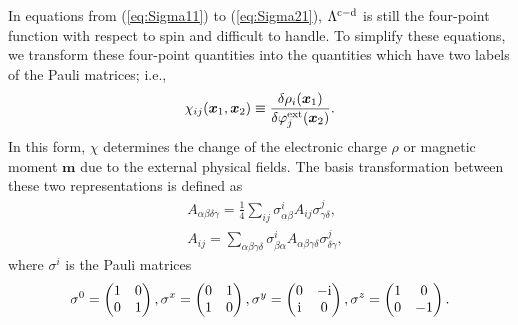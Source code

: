 %
In equations from (\ref{eq:Sigma11}) to (\ref{eq:Sigma21}), $\Lambda^{\rm c - \rm d}$ is still the
four-point function with respect to spin and difficult to handle.
To simplify these equations, we transform these four-point quantities into the quantities which have
two labels of the Pauli matrices; i.e.,
%
\begin{equation}
	\chi_{ij}(\bm x_1, \bm x_2) \equiv 
	\frac{\delta\rho_i(\bm x_1)}{\delta\varphi^{\rm ext}_{j}(\bm x_2)}.
	\label{eq:Paulichi}
\end{equation}
%
In this form, $\chi$ determines the change of the electronic charge $\rho$ or magnetic moment $\bm m$
due to the external physical fields.
The basis transformation between these two representations is defined as 
%
\begin{equation}
	\begin{split}
	& A_{\alpha\beta\delta\gamma} = \frac{1}{4}\sum_{ij}
	\sigma^{i}_{\alpha\beta}A_{ij}\sigma^{j}_{\gamma\delta}, \\
	& A_{ij} = \sum_{\alpha\beta\gamma\delta}
	\sigma^{i}_{\beta\alpha}A_{\alpha\beta\gamma\delta}\sigma^{j}_{\delta\gamma},
	\label{eq:basistrans}
\end{split}
\end{equation}
%
where $\sigma^{i}$ is the Pauli matrices
%
\begin{equation}
	\sigma^0 = 
	\begin{pmatrix}
		1 & 0 \\
		0 & 1
	\end{pmatrix},
	\sigma^x = 
	\begin{pmatrix}
		0 & 1 \\
		1 & 0
	\end{pmatrix},
	\sigma^y = 
	\begin{pmatrix}
		0 & -\rm i \\
		\rm i & 0
	\end{pmatrix},
	\sigma^z = 
	\begin{pmatrix}
		1 & 0 \\
		0 & -1
	\end{pmatrix}.
	\label{eq:Pauli}
\end{equation}
%
